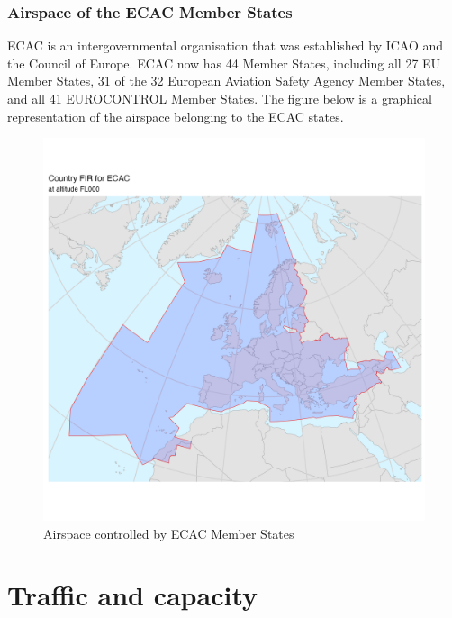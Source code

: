 \documentclass[
  11pt,
  a4paper,
]{book}
\begin{document}
\hypertarget{airspace-of-the-ecac-member-states}{%
\section*{Airspace of the ECAC Member
States}\label{airspace-of-the-ecac-member-states}}


ECAC is an intergovernmental organisation that was established by ICAO
and the Council of Europe. ECAC now has 44 Member States, including all
27 EU Member States, 31 of the 32 European Aviation Safety Agency Member
States, and all 41 EUROCONTROL Member States. The figure below is a
graphical representation of the airspace belonging to the ECAC states.

\begin{figure}

{\centering \includegraphics{chapters/../figures/ecac_airspace_fir.png}

}

\caption{\label{fig-ecac-airspace-fir}Airspace controlled by ECAC Member
States}

\end{figure}

\part{Traffic and capacity}
\end{document}
